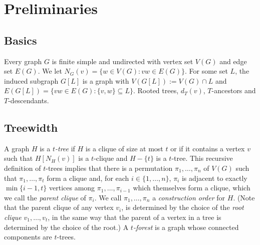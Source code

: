 \documentclass[kpfonts]{patmorin}
\newcommand{\uqs}{\chi_2}
\newcommand{\hus}{\hat{\chi}_2}
\begin{document}
%
%
%

\section{Preliminaries}

\subsection{Basics}

Every graph $G$ is finite simple and undirected with vertex set $V(G)$ and edge set $E(G)$.  We let $N_G(v)=\{w\in V(G): vw\in E(G)\}$.  For some set $L$, the induced subgraph  $G[L]$ is a graph with $V(G[L]):=V(G)\cap L$ and $E(G[L])=\{vw\in E(G): \{v,w\}\subseteq L\}$.  Rooted trees, $d_T(v)$, $T$-ancestors and $T$-descendants.

\subsection{Treewidth}

A graph $H$ is a \emph{$t$-tree} if $H$ is a clique of size at most $t$ or if it contains a vertex $v$ such that $H[N_H(v)]$ is a $t$-clique and $H-\{t\}$ is a $t$-tree.  This recursive definition of $t$-trees implies that there is a permutation $\pi_1,\ldots,\pi_n$ of $V(G)$ such that $\pi_1,\ldots,\pi_t$ form a clique and, for each $i\in\{1,\ldots,n\}$, $\pi_i$ is adjacent to exactly $\min\{i-1,t\}$ vertices among $\pi_1,\ldots,\pi_{i-1}$ which themselves form a clique, which we call the \emph{parent clique} of $\pi_i$.  We call $\pi_1,\ldots,\pi_n$ a \emph{construction order} for $H$.  (Note that the parent clique of any vertex $v_i$, is determined by the choice of the \emph{root clique} $v_1,\ldots,v_t$, in the same way that the parent of a vertex in a tree is determined by the choice of the root.)  A \emph{$t$-forest} is a graph whose connected components are $t$-trees.
\end{document}
